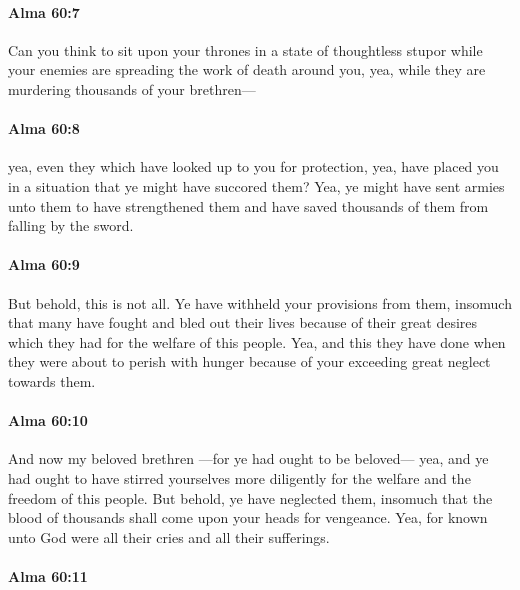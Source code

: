 		\paragraph{Alma 60:7} %
			\label{ALMA-60-7}

			Can you think to sit upon your thrones in a state of thoughtless stupor
			while your enemies are spreading the work of death around you,
			yea, while they are murdering thousands of your brethren---

		\paragraph{Alma 60:8} %
			\label{ALMA-60-8}

			yea, even they which have looked up to you for protection,
			yea, have placed you in a situation that ye might have succored them?
			Yea, ye might have sent armies unto them to have strengthened them
			and have saved thousands of them from falling by the sword.

		\paragraph{Alma 60:9} %
			\label{ALMA-60-9}

			But behold, this is not all.
			Ye have withheld your provisions from them,
			insomuch that many have fought and bled out their lives
			because of their great desires which they had for the welfare of this people.
			Yea, and this they have done when they were about to perish with hunger
			because of your exceeding great neglect towards them.

		\paragraph{Alma 60:10} %
			\label{ALMA-60-10}

			And now my beloved brethren
			---for ye had ought to be beloved---
			yea, and ye had ought to have stirred yourselves more diligently
			for the welfare and the freedom of this people.
			But behold, ye have neglected them,
			insomuch that the blood of thousands shall come upon your heads for vengeance.
			Yea, for known unto God were all their cries and all their sufferings.

		\paragraph{Alma 60:11} %
			\label{ALMA-60-11}


